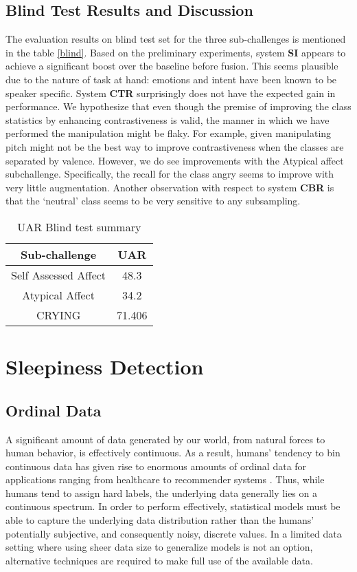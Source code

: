 \subsection{Blind Test Results and Discussion}

The evaluation results on blind test set for the three sub-challenges is mentioned in the table \ref{blind}. Based on the preliminary experiments, system \textbf{SI} appears to achieve a significant boost over the baseline before fusion. This seems plausible due to the nature of task at hand: emotions and intent have been known to be speaker specific. System \textbf{CTR} surprisingly does not have the expected gain in performance. We hypothesize that even though the premise of improving the class statistics by enhancing contrastiveness is valid, the manner in which we have performed the manipulation might be flaky. For example, given manipulating pitch might not be the  best way to improve contrastiveness when the classes are separated by valence. However, we do see improvements with the Atypical affect subchallenge. Specifically, the recall for the class angry seems to improve with very little augmentation. Another observation with respect to system \textbf{CBR} is that the `neutral' class seems to be very sensitive to any subsampling. 

\begin{table}[h]
\centering
\caption{UAR Blind test summary} 
\label{blind}
\begin{tabular}{|c|c|}
  \hline
Sub-challenge & UAR \\
  \hline
Self Assessed Affect  & 48.3\\
 \hline
Atypical Affect  &  34.2	\\
 \hline
CRYING   & 71.406\\
 
  \hline
\end{tabular}
\label{table_systems}
\end{table}

\section{Sleepiness Detection}


\subsection{Ordinal Data}

A significant amount of data generated by our world, from natural forces to human behavior, is effectively continuous.
As a result, humans' tendency to bin continuous data \cite{tee2018brain}
has given rise to enormous amounts of ordinal data for applications ranging from healthcare to recommender systems \cite{Marateb2014ManipulatingMS, Melville2017}.
Thus, while humans tend to assign hard labels, the underlying data generally lies on a continuous spectrum.
In order to perform effectively, statistical models must be able to capture the underlying data distribution rather than the humans' potentially subjective, and consequently noisy, discrete values. In a limited data setting where using sheer data size to generalize models is not an option, alternative techniques are required to make full use of the available data.

